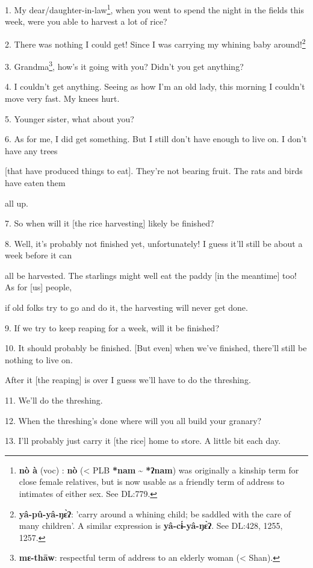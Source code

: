 \setcounter{footnote}{0}

1. My dear/daughter-in-law\footnote{\textbf{nò à} (voc) : \textbf{nò} (< PLB \textbf{*nam } \~{} \textbf{ *ʔnam}) was originally a kinship term for close female relatives, but is now usable as a friendly term of address to intimates of either sex. See DL:779.}, when you went to spend the night in the fields this week, were
you able to harvest a lot of rice?

2. There was nothing I could get! Since I was carrying my whining baby around!\footnote{\textbf{yâ-pû-yâ-ŋɛ̀ʔ}: 'carry around a whining child; be saddled with the care of many children'. A similar expression is \textbf{yâ-cɨ́-yâ-ŋɛ̀ʔ}. See DL:428, 1255, 1257.}

3. Grandma\footnote{\textbf{mɛ-thāw}: respectful term of address to an elderly woman (< Shan).}, how's it going with you? Didn't you get anything?

4. I couldn't get anything. Seeing as how I'm an old lady, this morning I couldn't
move very fast. My knees hurt.

5. Younger sister, what about you?

6. As for me, I did get something. But I still don't have enough to live on. I
don't have any trees

[that have produced things to eat]. They're not bearing fruit. The rats and birds
have eaten them

all up.

7. So when will it [the rice harvesting] likely be finished?

8. Well, it's probably not finished yet, unfortunately! I guess it'll still be
about a week before it can

all be harvested. The starlings might well eat the paddy [in the meantime] too!
As for [us] people,

if old folks try to go and do it, the harvesting will never get done.

9. If we try to keep reaping for a week, will it be finished?

10. It should probably be finished. [But even] when we've finished, there'll still
be nothing to live on.

After it [the reaping] is over I guess we'll have to do the threshing.

11. We'll do the threshing.

12. When the threshing's done where will you all build your granary?

13. I'll probably just carry it [the rice] home to store. A little bit each day.

